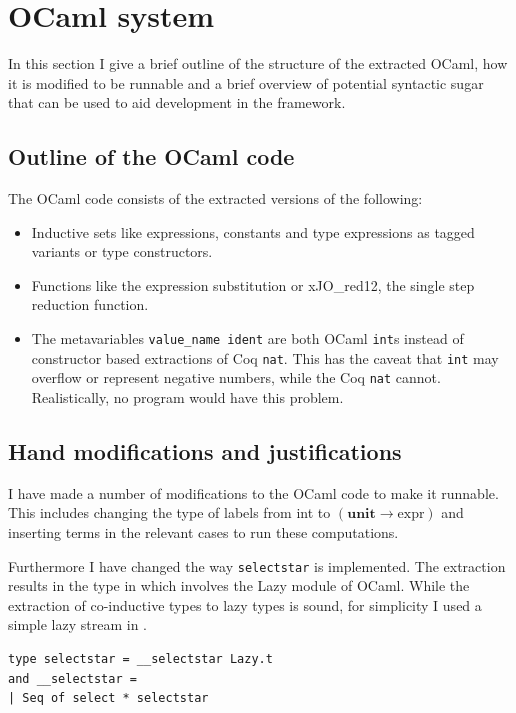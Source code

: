 \documentclass[12pt,twoside,notitlepage]{report}
\theoremstyle{plain}%
\theoremstyle{definition}
\theoremstyle{remark}
\begin{document}
\section{OCaml system}
In this section I give a brief outline of the structure of the extracted OCaml, how it is modified to be runnable and a brief overview of potential syntactic sugar that can be used to aid development in the framework. 

\subsection{Outline of the OCaml code}
The OCaml code consists of the extracted versions of the following:
\begin{itemize}
\item{Inductive sets like expressions, constants and type expressions as tagged variants or type constructors.}
\item{Functions like the expression substitution or xJO\_red12, the single step reduction function.}
\item{The metavariables \verb|value_name ident| are both OCaml \lstinline|int|s instead of constructor based extractions of Coq \lstinline[language={Coq}]|nat|. This has the caveat that \lstinline|int| may overflow or represent negative numbers, while the Coq \lstinline[language={Coq}]|nat| cannot. Realistically, no program would have this problem.}
\end{itemize}
\subsection{Hand modifications and justifications}
I have made a number of modifications to the OCaml code to make it runnable. This includes changing the type of labels from int to $ (\textbf{unit}\rightarrow\text{expr}) $ and inserting terms in the relevant cases to run these computations. 

Furthermore I have changed the way \verb|selectstar| is implemented. The extraction results in the type in  which involves the Lazy module of OCaml. While the extraction of co-inductive types to lazy types is sound, for simplicity I used a simple lazy stream in . 


\vspace{3mm}
\begin{minipage}{\linewidth}

\begin{lstlisting}[caption={OCaml lazy selectstar}, label={lst:ocamllazystar}]
type selectstar = __selectstar Lazy.t
and __selectstar =
| Seq of select * selectstar
\end{lstlisting}

\end{minipage}
\end{document}

